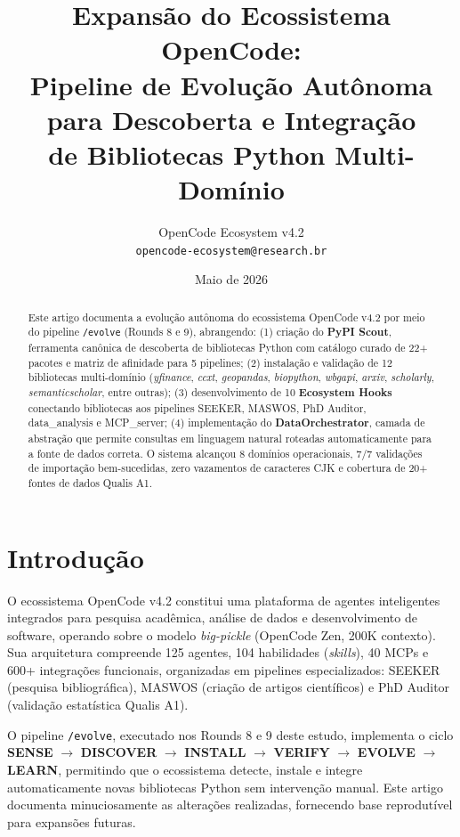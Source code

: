 \documentclass[12pt,a4paper]{article}
\title{\textbf{Expansão do Ecossistema OpenCode:}\\[4pt]
       \large Pipeline de Evolução Autônoma para Descoberta e Integração\\
       de Bibliotecas Python Multi-Domínio}
\author{OpenCode Ecosystem v4.2\\
        \texttt{opencode-ecosystem@research.br}}
\date{Maio de 2026}
\begin{document}
\maketitle

\begin{abstract}
\noindent Este artigo documenta a evolução autônoma do ecossistema OpenCode v4.2 por meio do pipeline \texttt{/evolve} (Rounds 8 e 9), abrangendo: (1) criação do \textbf{PyPI Scout}, ferramenta canônica de descoberta de bibliotecas Python com catálogo curado de 22+ pacotes e matriz de afinidade para 5 pipelines; (2) instalação e validação de 12 bibliotecas multi-domínio (\textit{yfinance}, \textit{ccxt}, \textit{geopandas}, \textit{biopython}, \textit{wbgapi}, \textit{arxiv}, \textit{scholarly}, \textit{semanticscholar}, entre outras); (3) desenvolvimento de 10 \textbf{Ecosystem Hooks} conectando bibliotecas aos pipelines SEEKER, MASWOS, PhD Auditor, data\_analysis e MCP\_server; (4) implementação do \textbf{DataOrchestrator}, camada de abstração que permite consultas em linguagem natural roteadas automaticamente para a fonte de dados correta. O sistema alcançou 8 domínios operacionais, 7/7 validações de importação bem-sucedidas, zero vazamentos de caracteres CJK e cobertura de 20+ fontes de dados Qualis A1.
\end{abstract}

\section{Introdução}

O ecossistema OpenCode v4.2 constitui uma plataforma de agentes inteligentes integrados para pesquisa acadêmica, análise de dados e desenvolvimento de software, operando sobre o modelo \textit{big-pickle} (OpenCode Zen, 200K contexto). Sua arquitetura compreende 125 agentes, 104 habilidades (\textit{skills}), 40 MCPs e 600+ integrações funcionais, organizadas em pipelines especializados: SEEKER (pesquisa bibliográfica), MASWOS (criação de artigos científicos) e PhD Auditor (validação estatística Qualis A1).

O pipeline \texttt{/evolve}, executado nos Rounds 8 e 9 deste estudo, implementa o ciclo \textbf{SENSE} $\rightarrow$ \textbf{DISCOVER} $\rightarrow$ \textbf{INSTALL} $\rightarrow$ \textbf{VERIFY} $\rightarrow$ \textbf{EVOLVE} $\rightarrow$ \textbf{LEARN}, permitindo que o ecossistema detecte, instale e integre automaticamente novas bibliotecas Python sem intervenção manual. Este artigo documenta minuciosamente as alterações realizadas, fornecendo base reprodutível para expansões futuras.
\end{document}
